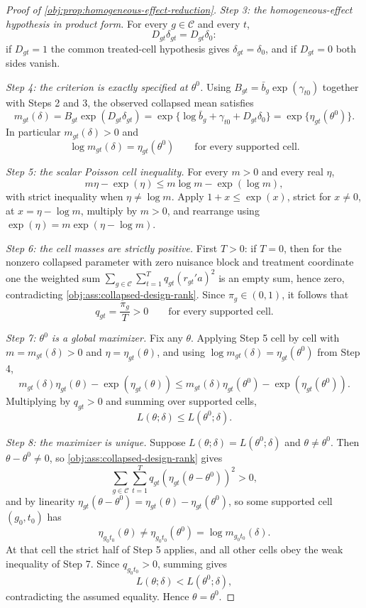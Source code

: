 \documentclass[11pt]{article}
\begin{document}
\begin{proof}[Proof of \cref{obj:prop:homogeneous-effect-reduction}]
\textit{Step 3: the homogeneous-effect hypothesis in product form.} For every \(g\in\mathcal C\) and every \(t\),
\[
D_{gt}\delta_{gt}=D_{gt}\delta_0 :
\]
if \(D_{gt}=1\) the common treated-cell hypothesis gives \(\delta_{gt}=\delta_0\), and if \(D_{gt}=0\) both sides vanish.

\textit{Step 4: the criterion is exactly specified at \(\theta^0\).} Using \(B_{gt}=\bar b_g\exp(\gamma_{t0})\) together with Steps 2 and 3, the observed collapsed mean satisfies
\[
m_{gt}(\delta)
=
B_{gt}\exp(D_{gt}\delta_{gt})
=
\exp\{\log\bar b_g+\gamma_{t0}+D_{gt}\delta_0\}
=
\exp\{\eta_{gt}(\theta^0)\}.
\]
In particular \(m_{gt}(\delta)>0\) and
\[
\log m_{gt}(\delta)=\eta_{gt}(\theta^0)
\qquad\text{for every supported cell.}
\]

\textit{Step 5: the scalar Poisson cell inequality.} For every \(m>0\) and every real \(\eta\),
\[
m\eta-\exp(\eta)\le m\log m-\exp(\log m),
\]
with strict inequality when \(\eta\neq\log m\). Apply \(1+x\le\exp(x)\), strict for \(x\neq0\), at \(x=\eta-\log m\), multiply by \(m>0\), and rearrange using \(\exp(\eta)=m\exp(\eta-\log m)\).

\textit{Step 6: the cell masses are strictly positive.} First \(T>0\): if \(T=0\), then for the nonzero collapsed parameter with zero nuisance block and treatment coordinate one the weighted sum \(\sum_{g\in\mathcal C}\sum_{t=1}^T q_{gt}(r_{gt}'a)^2\) is an empty sum, hence zero, contradicting \cref{obj:ass:collapsed-design-rank}. Since \(\pi_g\in(0,1)\), it follows that
\[
q_{gt}=\frac{\pi_g}{T}>0
\qquad\text{for every supported cell.}
\]

\textit{Step 7: \(\theta^0\) is a global maximizer.} Fix any \(\theta\). Applying Step 5 cell by cell with \(m=m_{gt}(\delta)>0\) and \(\eta=\eta_{gt}(\theta)\), and using \(\log m_{gt}(\delta)=\eta_{gt}(\theta^0)\) from Step 4,
\[
m_{gt}(\delta)\eta_{gt}(\theta)-\exp\!\left(\eta_{gt}(\theta)\right)
\le
m_{gt}(\delta)\eta_{gt}(\theta^0)-\exp\!\left(\eta_{gt}(\theta^0)\right).
\]
Multiplying by \(q_{gt}>0\) and summing over supported cells,
\[
L(\theta;\delta)\le L(\theta^0;\delta).
\]

\textit{Step 8: the maximizer is unique.} Suppose \(L(\theta;\delta)=L(\theta^0;\delta)\) and \(\theta\neq\theta^0\). Then \(\theta-\theta^0\neq0\), so \cref{obj:ass:collapsed-design-rank} gives
\[
\sum_{g\in\mathcal C}\sum_{t=1}^T q_{gt}\left(\eta_{gt}(\theta-\theta^0)\right)^2>0 ,
\]
and by linearity \(\eta_{gt}(\theta-\theta^0)=\eta_{gt}(\theta)-\eta_{gt}(\theta^0)\), so some supported cell \((g_0,t_0)\) has
\[
\eta_{g_0t_0}(\theta)\neq\eta_{g_0t_0}(\theta^0)=\log m_{g_0t_0}(\delta).
\]
At that cell the strict half of Step 5 applies, and all other cells obey the weak inequality of Step 7. Since \(q_{g_0t_0}>0\), summing gives
\[
L(\theta;\delta)<L(\theta^0;\delta),
\]
contradicting the assumed equality. Hence \(\theta=\theta^0\).


\end{proof}
\end{document}
